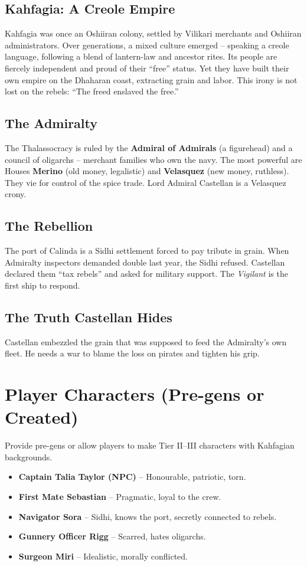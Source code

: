 \documentclass[11pt]{article}
\begin{document}
\subsection{Kahfagia: A Creole Empire}
Kahfagia was once an Oshiiran colony, settled by Vilikari merchants and Oshiiran administrators. Over generations, a mixed culture emerged -- speaking a creole language, following a blend of lantern-law and ancestor rites. Its people are fiercely independent and proud of their ``free'' status. Yet they have built their own empire on the Dhaharan coast, extracting grain and labor. This irony is not lost on the rebels: ``The freed enslaved the free.''

\subsection{The Admiralty}
The Thalassocracy is ruled by the \textbf{Admiral of Admirals} (a figurehead) and a council of oligarchs -- merchant families who own the navy. The most powerful are Houses \textbf{Merino} (old money, legalistic) and \textbf{Velasquez} (new money, ruthless). They vie for control of the spice trade. Lord Admiral Castellan is a Velasquez crony.

\subsection{The Rebellion}
The port of Calinda is a Sidhi settlement forced to pay tribute in grain. When Admiralty inspectors demanded double last year, the Sidhi refused. Castellan declared them ``tax rebels'' and asked for military support. The \textit{Vigilant} is the first ship to respond.

\subsection{The Truth Castellan Hides}
Castellan embezzled the grain that was supposed to feed the Admiralty's own fleet. He needs a war to blame the loss on pirates and tighten his grip.

\section{Player Characters (Pre-gens or Created)}

Provide pre-gens or allow players to make Tier II--III characters with Kahfagian backgrounds.

\begin{itemize}
    \item \textbf{Captain Talia Taylor (NPC)} -- Honourable, patriotic, torn.
    \item \textbf{First Mate Sebastian} -- Pragmatic, loyal to the crew.
    \item \textbf{Navigator Sora} -- Sidhi, knows the port, secretly connected to rebels.
    \item \textbf{Gunnery Officer Rigg} -- Scarred, hates oligarchs.
    \item \textbf{Surgeon Miri} -- Idealistic, morally conflicted.
\end{itemize}
\end{document}
